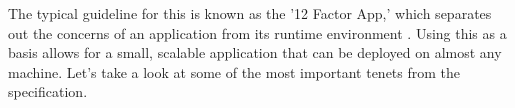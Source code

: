 \documentclass[12pt, oneside, a4paper]{book}
\begin{document}
      The typical guideline for this is known as the '12 Factor App\footnotemark,' which separates out the concerns of an application from its runtime environment \autocite{wigginsTwelveFactorApp2017}.
      Using this as a basis allows for a small, scalable application that can be deployed on almost any machine.
      Let's take a look at some of the most important tenets from the specification.


\newpage
{}
\printbibliography[title={Works Cited},heading=bibintoc]
\end{document}
